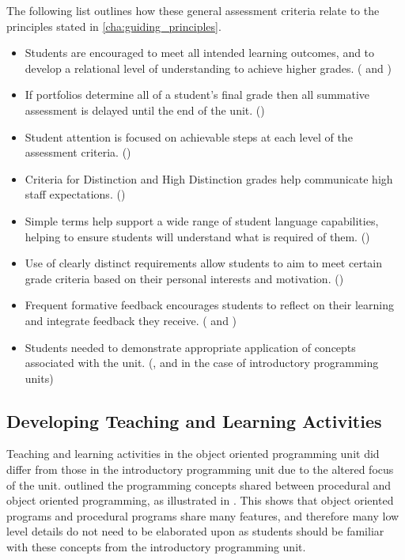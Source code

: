 The following list outlines how these general assessment criteria relate to the principles stated in \cref{cha:guiding_principles}.

\begin{itemize}[noitemsep,nolistsep]
	\item Students are encouraged to meet all intended learning outcomes, and to develop a relational level of understanding to achieve higher grades. ( and )
	\item If portfolios determine all of a student's final grade then all summative assessment is delayed until the end of the unit. ()
	\item Student attention is focused on achievable steps at each level of the assessment criteria. ()
	\item Criteria for Distinction and High Distinction grades help communicate high staff expectations. ()
	\item Simple terms help support a wide range of student language capabilities, helping to ensure students will understand what is required of them. ()
	\item Use of clearly distinct requirements allow students to aim to meet certain grade criteria based on their personal interests and motivation. ()
	\item Frequent formative feedback encourages students to reflect on their learning and integrate feedback they receive. ( and )
	\item Students needed to demonstrate appropriate application of concepts associated with the unit. (,  and  in the case of introductory programming units)
\end{itemize}


\subsection{Developing Teaching and Learning Activities} %
\label{sub:oop_developing_teaching_and_learning_activities}

Teaching and learning activities in the object oriented programming unit did differ from those in the introductory programming unit due to the altered focus of the unit.  outlined the programming concepts shared between procedural and object oriented programming, as illustrated in . This shows that object oriented programs and procedural programs share many features, and therefore many low level details do not need to be elaborated upon as students should be familiar with these concepts from the introductory programming unit. 

